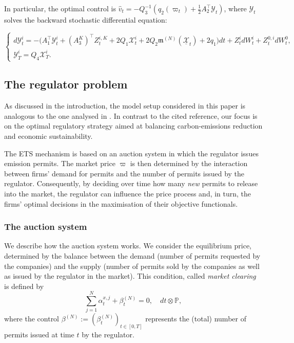 \documentclass[11pt,twoside]{amsart}
\theoremstyle{definition}
\numberwithin{equation}{section}
\newcommand{\w}{\varpi}
\begin{document}
In particular, the optimal control is $\widehat{v}_t=-Q_3^{-1}(q_2(\w_t)+\frac{1}{2}A_2^\top \mathcal{Y}_t)$, where $\mathcal{Y}_t$ solves the backward stochastic differential equation:


\begin{equation} 
\label{eqn: adjoint process N}
\begin{cases}
d\mathcal{Y}^i_t = -\big( A_1^\top \mathcal{Y}^i_t + (A^K_3)^\top Z^{i,K}_t + 2Q_1\mathcal{X}^i_t + 2Q_2 \mathfrak{m}^{(N)}(\underline{\mathcal{X}}_t) + 2q_1 \big)dt + Z^i_t dW^i_t + Z^{0,i}_t dW^0_t ,\\
\mathcal{Y}^i_T = Q_4\mathcal{X}^i_T.
\end{cases}
\end{equation} 

\subsection{The regulator problem}
\label{subsect_model_N:regulator}
As discussed in the introduction, the model setup considered in this paper is analogous to the one analysed in \cite[Section 3]{del2024mean}. In contrast to the cited reference, our focus is on the optimal regulatory strategy aimed at balancing carbon-emissions reduction and economic sustainability. 

The ETS mechanism is based on an auction system in which the regulator issues emission permits. The market price $\varpi$ is then determined by the interaction between firms’ demand for permits and the number of permits issued by the regulator. Consequently, by deciding over time how many \emph{new} permits to release into the market, the regulator can influence the price process and, in turn, the firms’ optimal decisions in the maximisation of their objective functionals.

\subsubsection{The auction system}
We describe how the auction system works. We consider the equilibrium price, determined by the balance between the demand (number of permits requested by the companies) and the supply (number of permits sold by the companies as well as issued by the regulator in the market). This condition, called \emph{market clearing} is defined by
\begin{equation}
\label{eqn: market clearing N market}
\sum_{j = 1}^{N} \alpha^{x,j}_t + \beta^{(N)}_t = 0,\quad dt\otimes \mathbb{P},
\end{equation} 
where the control $\beta^{(N)}:= (\beta^{(N)}_t)_{t\in[0,T]}$  represents the (total) number of permits issued at time $t$ by the regulator.
\end{document}
